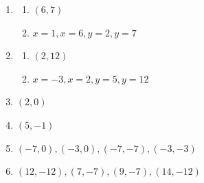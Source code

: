 \documentclass[12pt]{article}
\begin{document}
\begin{enumerate}
    \item \begin{enumerate}
        \item \((6,7)\)
        \item \(x=1, x=6, y=2, y= 7\)
    \end{enumerate}

    \item \begin{enumerate}
        \item \((2,12)\)
        \item \(x=-3, x=2, y=5, y=12\)
    \end{enumerate}

    \item \((2,0)\)

    \item \((5,-1)\)

    \item \((-7,0), (-3,0), (-7,-7), (-3,-3)\)

    \item \((12,-12), (7, -7), (9,-7), (14,-12)\)
\end{enumerate}
\end{document}
